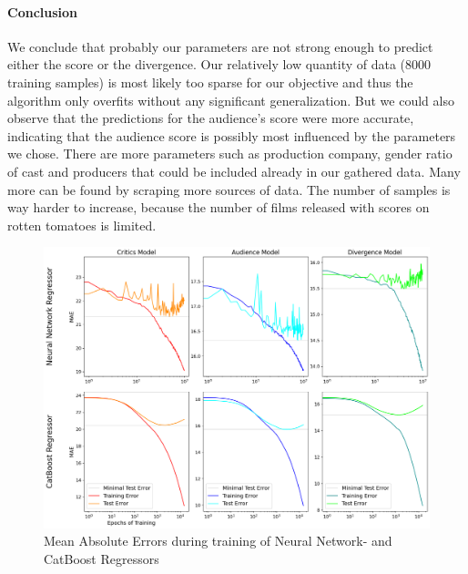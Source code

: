 \documentclass{article}
\begin{document}
    \paragraph{Conclusion}
    We conclude that probably our parameters are not strong enough to predict either the score or the divergence. Our relatively low quantity of data (8000 training samples) is most likely too sparse for our objective and thus the algorithm only overfits without any significant generalization. But we could also observe that the predictions for the audience's score were more accurate, indicating that the audience score is possibly most influenced by the parameters we chose. There are more parameters such as production company, gender ratio of cast and producers that could be included already in our gathered data. Many more can be found by scraping more sources of data. The number of samples is way harder to increase, because the number of films released with scores on rotten tomatoes is limited.
    \begin{figure}[tb]
        \centering
        \includegraphics[width=1\textwidth]{imgs/regression_errors.png}
        \caption{Mean Absolute Errors during training of Neural Network- and CatBoost Regressors}
        \label{fig:mae_errors}
    \end{figure}



\end{document}
